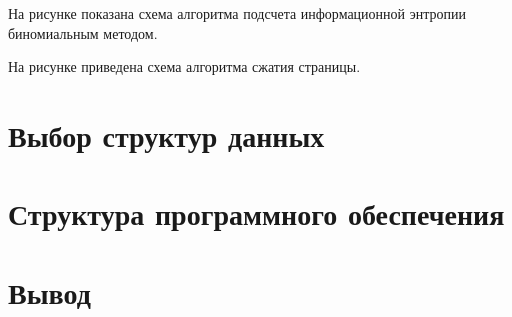 На рисунке  показана схема алгоритма подсчета информационной энтропии биномиальным методом.

На рисунке  приведена схема алгоритма сжатия страницы.

\section{Выбор структур данных}

\section{Структура программного обеспечения}

\section*{Вывод}

